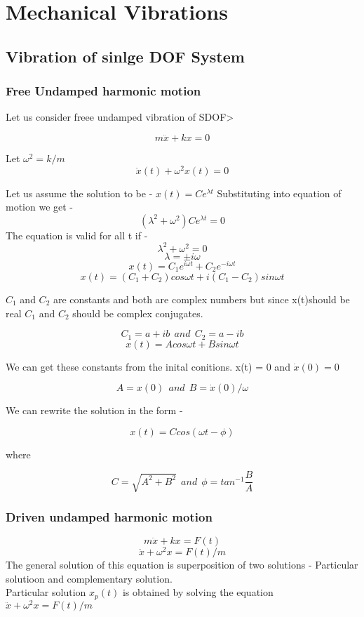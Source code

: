 \documentclass{book}
\begin{document}
 
\tableofcontents
\part{Mechanical Vibrations}
\chapter{Vibration of sinlge DOF System}
\section{Free Undamped harmonic motion}
Let us consider freee undamped vibration of SDOF>

\[ m \ddot{x} + kx =0\]

Let \( \omega^2 = k/m\)
\[ \ddot{x}(t) + \omega^2 x(t) = 0\]

Let us assume the solution to be - \( x(t) = Ce^{\lambda t}\)
Substituting into equation of motion we get - 
\[ (\lambda^2 + \omega^2) C e^{\lambda t} = 0\] 
The equation is valid for all t if - 
\[ \lambda^2 + \omega^2 = 0\]
\[ \lambda = \pm i\omega \]
\[ x(t) = C_1e^{i\omega t} + C_2 e^{-i \omega t}\] 
\[ x(t) = (C_1 + C_2) cos \omega t + i (C_1 - C_2) sin \omega t\]

\(C_1\) and \( C_2\) are constants and both are complex numbers but since x(t)should be real \(C_1\) and \(C_2\) should be complex conjugates.

\[ C_1 = a+ib \ \  and \ \ C_2 = a-ib\]
\[ x(t) = A cos \omega t + B sin \omega t\]

We can get these constants from the inital conitions. x(t) = 0 and \(\dot{x}(0) = 0\)

\[ A = x(0) \ \ and \ \ B = \dot{x}(0)/ \omega \]

We can rewrite the solution in the form - 

\[ x(t) = C cos( \omega t - \phi) \] 

where 

\[ C = \sqrt{A^2 + B^2 } \ \ and \ \ \phi = tan^{-1}\frac{B}{A} \]


\section{Driven undamped harmonic motion}
\[m\ddot{x} + kx = F(t)\]
\[\ddot{x} + \omega^2{x} = F(t)/m\]
The general solution of this equation is superposition of two solutions - Particular solutioon and complementary solution.\\

\noindent
Particular solution \( x_p(t)\) is obtained by solving the equation \(\ddot{x} + \omega^2{x} = F(t)/m \)\\
\end{document}
